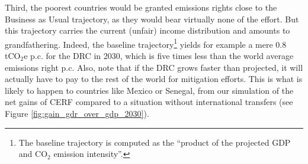 Third, the poorest countries would be granted emissions rights close to the Business as Usual trajectory, as they would bear virtually none of the effort. But this trajectory carries the current (unfair) income distribution and amounts to grandfathering. Indeed, the baseline trajectory\footnote{The baseline trajectory is computed as the ``product of the projected GDP and CO$_\text{2}$ emission intensity''.} yields for example a mere 0.8 tCO$_\text{2}$e p.c. for the DRC in 2030, which is five times less than the world average emissions right p.c. 
Also, note that if the DRC grows faster than projected, it will actually have to pay to the rest of the world for mitigation efforts. This is what is likely to happen to countries like Mexico or Senegal, from our simulation of the net gains of CERF compared to a situation without international transfers (see Figure \ref{fig:gain_gdr_over_gdp_2030}). 